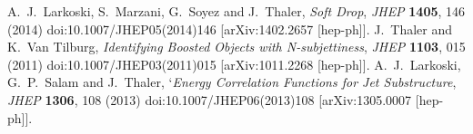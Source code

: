 \documentclass[a4paper]{PoS}
\begin{document}
\begin{thebibliography}{99}
  A.~J.~Larkoski, S.~Marzani, G.~Soyez and J.~Thaler,
  \emph{Soft Drop},
  \emph{JHEP} {\bf 1405}, 146 (2014)
  doi:10.1007/JHEP05(2014)146
  [arXiv:1402.2657 [hep-ph]].
  J.~Thaler and K.~Van Tilburg,
  \emph{Identifying Boosted Objects with N-subjettiness},
  \emph{JHEP} {\bf 1103}, 015 (2011)
  doi:10.1007/JHEP03(2011)015
  [arXiv:1011.2268 [hep-ph]].
  A.~J.~Larkoski, G.~P.~Salam and J.~Thaler,
  `\emph{Energy Correlation Functions for Jet Substructure},
  \emph{JHEP} {\bf 1306}, 108 (2013)
  doi:10.1007/JHEP06(2013)108
  [arXiv:1305.0007 [hep-ph]].
\end{thebibliography}
\end{document}
